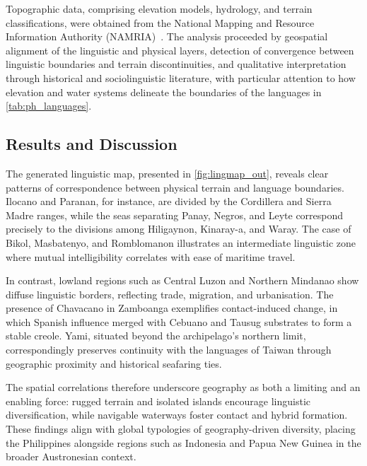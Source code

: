 Topographic data, comprising elevation models, hydrology, and terrain
classifications, were obtained from the National Mapping and Resource
Information Authority (NAMRIA)~\cite{NAMRIA_Downloads}. The analysis proceeded by
geospatial alignment of the linguistic and physical layers, detection of
convergence between linguistic boundaries and terrain discontinuities, and
qualitative interpretation through historical and sociolinguistic literature,
with particular attention to how elevation and water systems delineate the
boundaries of the languages in \cref{tab:ph_languages}.

\subsection{Results and Discussion}

The generated linguistic map, presented in \cref{fig:lingmap_out}, reveals clear
patterns of correspondence between physical terrain and language boundaries.
Ilocano and Paranan, for instance, are divided by the Cordillera and Sierra Madre
ranges, while the seas separating Panay, Negros, and Leyte correspond precisely to
the divisions among Hiligaynon, Kinaray-a, and Waray. The case of Bikol,
Masbatenyo, and Romblomanon illustrates an intermediate linguistic zone where
mutual intelligibility correlates with ease of maritime travel.

In contrast, lowland regions such as Central Luzon and Northern Mindanao show
diffuse linguistic borders, reflecting trade, migration, and urbanisation. The
presence of Chavacano in Zamboanga exemplifies contact-induced change, in which
Spanish influence merged with Cebuano and Tausug substrates to form a stable
creole. Yami, situated beyond the archipelago's northern limit, correspondingly
preserves continuity with the languages of Taiwan through geographic proximity
and historical seafaring ties.

The spatial correlations therefore underscore geography as both a limiting and an
enabling force: rugged terrain and isolated islands encourage linguistic
diversification, while navigable waterways foster contact and hybrid formation.
These findings align with global typologies of geography-driven diversity,
placing the Philippines alongside regions such as Indonesia and Papua New Guinea
in the broader Austronesian context.

